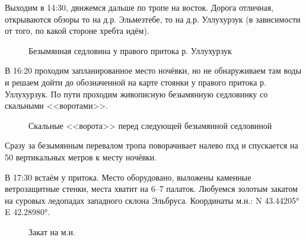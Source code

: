 Выходим в 14:30, движемся дальше по тропе на восток. Дорога отличная, открываются обзоры то на д.р. Эльмезтебе, то на д.р. Уллухурзук (в зависимости от того, по какой стороне хребта идём). 

\begin{figure}[h!]
	\centering
	\caption{Безымянная седловина у правого притока р. Уллухурзук}
	\label{fig:saddle}
\end{figure}


В 16:20 проходим запланированное место ночёвки, но не обнаруживаем там воды и решаем дойти до обозначенной на карте стоянки у правого притока р. Уллухурзук. По пути проходим живописную безымянную седловинку со скальными <<воротами>>.

\begin{figure}[h!]
	\centering
	\caption{Скальные <<ворота>> перед следующей безымянной седловиной}
	\label{fig:gate}
\end{figure}
 
Сразу за безымянным перевалом тропа поворачивает налево пхд и спускается на 50 вертикальных метров к месту ночёвки.

В 17:30 встаём у притока. Место оборудовано, выложены каменные ветрозащитные стенки, места хватит на 6--7 палаток. Любуемся золотым закатом на суровых ледопадах западного склона Эльбруса. Координаты м.н.: N 43.44205° E 42.28980°.

\begin{figure}[h!]
	\centering
	\caption{Закат на м.н.}
	\label{fig:camp06}
\end{figure}

\clearpage